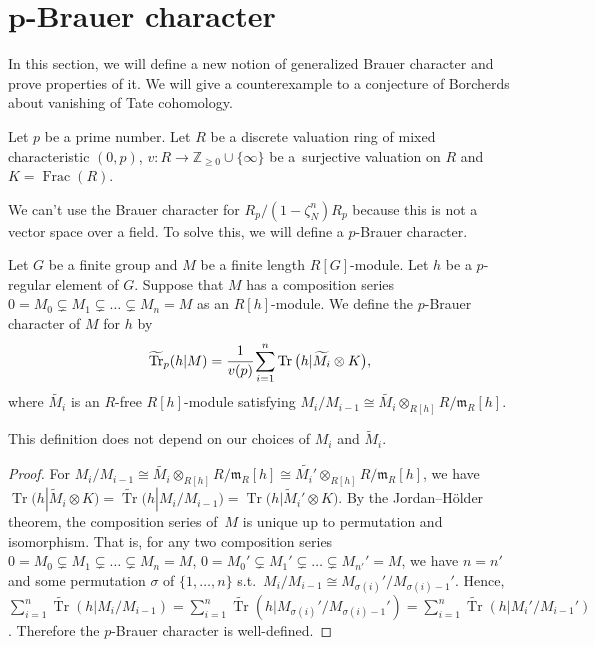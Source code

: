 \section[p-Brauer character]{$\boldsymbol{p}$-Brauer character}\label{section5}

In this section, we will define a new notion of generalized Brauer character and prove properties of it. We will give a counterexample to a conjecture of Borcherds about vanishing of Tate cohomology.

Let $p$ be a prime number. Let $R$ be a discrete valuation ring of mixed characteristic $(0,p)$, $v\colon R\rightarrow \mathbb{Z}_{\geq 0}\cup \{ \infty \}$ be a~surjective valuation on $R$ and $K=\operatorname{Frac}(R)$.

We can't use the Brauer character for $R_p/(1-\zeta_N^n)R_p$ because this is not a vector space over a field. To solve this, we will define a $p$-Brauer character.

\begin{Definition}\label{def5.1}
Let $G$ be a finite group and $M$ be a finite length $R[G]$-module. Let $h$ be a $p$-regular element of $G$. Suppose that $M$ has a composition series $0=M_0\subsetneq M_1\subsetneq \dots \subsetneq M_n=M$ as an $R[h]$-module.
 We define the $p$-Brauer character of $M$ for $h$ by
\[
\widetilde{\operatorname{Tr}}_p(h|M)=\cfrac{1}{v(p)} \sum_{i=1}^{n}\operatorname{Tr} \big(h|\widetilde{M_i}\otimes K\big),
\]
 where $\widetilde{M_i}$ is an $R$-free $R[h]$-module satisfying $M_i/M_{i-1} \cong\widetilde{{M}_i}\otimes_{R[h]}R/\mathfrak{m}_R[h]$.
\end{Definition}

\begin{Lemma}
This definition does not depend on our choices of $M_i$ and $\widetilde{M}_i$.
\end{Lemma}

\begin{proof}
For $M_i/M_{i-1} \cong\widetilde{{M}_i}\otimes_{R[h]}R/\mathfrak{m}_R[h]\cong\widetilde{{M}_i'}\otimes_{R[h]}R/\mathfrak{m}_R[h]$, we have $\operatorname{Tr}\big(h|\widetilde{M}_i\otimes K\big)=\widetilde{\operatorname{Tr}}(h|M_i/M_{i-1})=\operatorname{Tr}\big(h|\widetilde{M}_i'\otimes K\big)$. By the Jordan--H\"older theorem, the composition series of~$M$ is unique up to permutation and isomorphism. That is, for any two composition series $0=M_0\subsetneq M_1\subsetneq \dots \subsetneq M_n=M$, $0=M_0'\subsetneq M_1'\subsetneq \dots \subsetneq M_{n'}'=M$, we have $n=n'$ and some permutation $\sigma$ of $\{1,\dots,n\}$ s.t.\ $M_i/M_{i-1}\cong M_{\sigma(i)}'/M_{\sigma(i)-1}'$. Hence, $\sum_{i=1}^{n}\widetilde{\operatorname{Tr}}(h|M_i/M_{i-1})=\sum_{i=1}^{n}\widetilde{\operatorname{Tr}}(h|M_{\sigma(i)}'/M_{\sigma(i)-1}') =\sum_{i=1}^n\widetilde{\operatorname{Tr}}(h|M_i'/M_{i-1}')$. Therefore the $p$-Brauer character is well-defined.
\end{proof}

